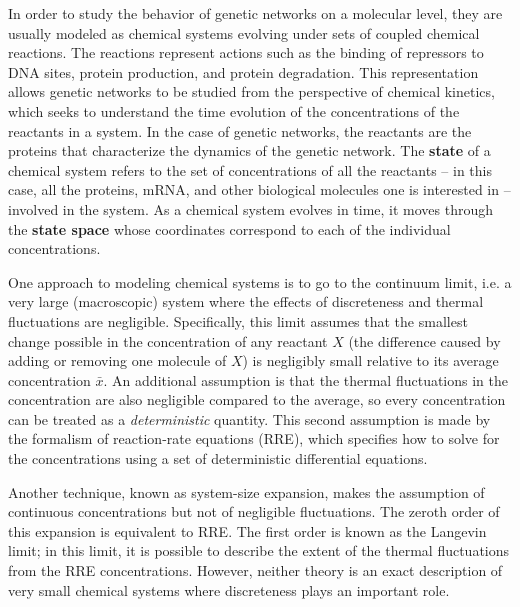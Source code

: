 \documentclass[english,letterpaper,12pt]{report}
\newcommand{\defkeywd}[1]{\textbf{#1}}
\begin{document}
\begin{doublespacing}
In order to study the behavior of genetic networks on a molecular level, they are usually modeled as chemical systems evolving under sets of coupled chemical reactions. The reactions represent actions such as the binding of repressors to DNA sites, protein production, and protein degradation. This representation allows genetic networks to be studied from the perspective of chemical kinetics, which seeks to understand the time evolution of the concentrations of the reactants in a system. In the case of genetic networks, the reactants are the proteins that characterize the dynamics of the genetic network. The \defkeywd{state} of a chemical system refers to the set of concentrations of all the reactants -- in this case, all the proteins, mRNA, and other biological molecules one is interested in -- involved in the system. As a chemical system evolves in time, it moves through the \defkeywd{state space} whose coordinates correspond to each of the individual concentrations.

One approach to modeling chemical systems is to go to the continuum limit, i.e. a very large (macroscopic) system where the effects of discreteness and thermal fluctuations are negligible. Specifically, this limit assumes that the smallest change possible in the concentration of any reactant $X$ (the difference caused by adding or removing one molecule of $X$) is negligibly small relative to its average concentration $\bar{x}$. An additional assumption is that the thermal fluctuations in the concentration are also negligible compared to the average, so every concentration can be treated as a \emph{deterministic} quantity. This second assumption is made by the formalism of reaction-rate equations (RRE), which specifies how to solve for the concentrations using a set of deterministic differential equations. 

Another technique, known as system-size expansion, makes the assumption of continuous concentrations but not of negligible fluctuations. The zeroth order of this expansion is equivalent to RRE. The first order is known as the Langevin limit; in this limit, it is possible to describe the extent of the thermal fluctuations from the RRE concentrations. However, neither theory is an exact description of very small chemical systems where discreteness plays an important role. 


\end{doublespacing}
\end{document}
